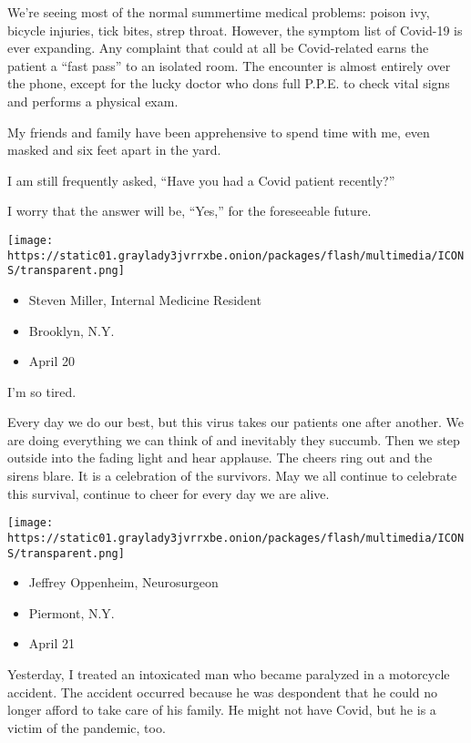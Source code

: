 We're seeing most of the normal summertime medical problems: poison ivy,
bicycle injuries, tick bites, strep throat. However, the symptom list of
Covid-19 is ever expanding. Any complaint that could at all be
Covid-related earns the patient a ``fast pass'' to an isolated room. The
encounter is almost entirely over the phone, except for the lucky doctor
who dons full P.P.E. to check vital signs and performs a physical exam.

My friends and family have been apprehensive to spend time with me, even
masked and six feet apart in the yard.

I am still frequently asked, ``Have you had a Covid patient recently?''

I worry that the answer will be, ``Yes,'' for the foreseeable future.

\texttt{[image: https://static01.graylady3jvrrxbe.onion/packages/flash/multimedia/ICONS/transparent.png]}

\begin{itemize}
\tightlist
\item
  Steven Miller, Internal Medicine Resident
\item
  Brooklyn, N.Y.
\item
  April 20
\end{itemize}

I'm so tired.

Every day we do our best, but this virus takes our patients one after
another. We are doing everything we can think of and inevitably they
succumb. Then we step outside into the fading light and hear applause.
The cheers ring out and the sirens blare. It is a celebration of the
survivors. May we all continue to celebrate this survival, continue to
cheer for every day we are alive.

\texttt{[image: https://static01.graylady3jvrrxbe.onion/packages/flash/multimedia/ICONS/transparent.png]}

\begin{itemize}
\tightlist
\item
  Jeffrey Oppenheim, Neurosurgeon
\item
  Piermont, N.Y.
\item
  April 21
\end{itemize}

Yesterday, I treated an intoxicated man who became paralyzed in a
motorcycle accident. The accident occurred because he was despondent
that he could no longer afford to take care of his family. He might not
have Covid, but he is a victim of the pandemic, too.

